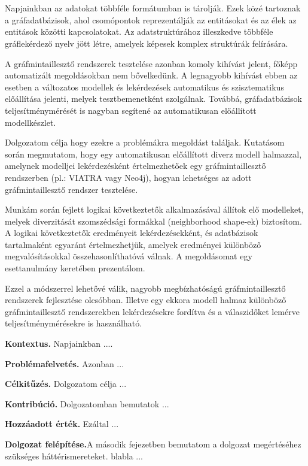 \chapter{\bevezetes}

Napjainkban az adatokat többféle formátumban is tárolják. Ezek közé tartoznak a gráfadatbázisok, ahol  csomópontok reprezentálják az entitásokat és az élek az entitások közötti kapcsolatokat. Az adatstruktúrához illeszkedve többféle gráflekérdező nyelv jött létre, amelyek képesek komplex struktúrák felírására.

A gráfmintaillesztő rendszerek tesztelése azonban komoly kihívást jelent, főképp automatizált megoldásokban nem bővelkedünk. A legnagyobb kihívást ebben az esetben a változatos modellek és lekérdezések automatikus és szisztematikus előállítása jelenti, melyek tesztbemenetként szolgálnak. Továbbá, gráfadatbázisok teljesítménymérését is nagyban segítené  az automatikusan előállított modellkészlet.

Dolgozatom célja hogy ezekre a problémákra megoldást találjak. Kutatásom során   megmutatom, hogy egy automatikusan előállított diverz modell halmazzal, amelynek modelljei lekérdezésként értelmezhetőek egy gráfmintaillesztő rendszerben (pl.: VIATRA vagy Neo4j), hogyan lehetséges  az adott gráfmintaillesztő rendszer tesztelése.

Munkám során fejlett logikai következtetők alkalmazásával állítok elő modelleket, melyek diverzitását szomszédsági formákkal (neighborhood shape-ek) biztosítom. A logikai következtetők eredményeit lekérdezésekként, és adatbázisok tartalmaként egyaránt értelmezhetjük, amelyek eredményei különböző megvalósításokkal összehasonlíthatóvá válnak. A megoldásomat egy esettanulmány keretében prezentálom.

Ezzel a módszerrel lehetővé válik, nagyobb megbízhatóságú gráfmintaillesztő rendszerek fejlesztése olcsóbban. Illetve egy ekkora modell halmaz különböző gráfmintaillesztő rendszerekben lekérdezésekre fordítva és a válaszidőket lemérve teljesítménymérésekre is használható.




\textbf{Kontextus.} Napjainkban ....

\textbf{Problémafelvetés.} Azonban ...

\textbf{Célkitűzés.} Dolgozatom célja ...

\textbf{Kontribúció.} Dolgozatomban bemutatok ...

\textbf{Hozzáadott érték.} Ezáltal ...

\textbf{Dolgozat felépítése.}A második fejezetben bemutatom a dolgozat megértéséhez szükséges háttérismereteket. blabla ...

